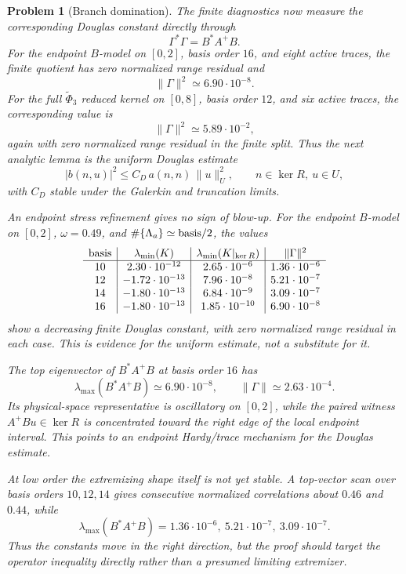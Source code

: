 \documentclass[11pt]{article}
\newtheorem{problem}[theorem]{Problem}
\begin{document}
\begin{problem}[Branch domination]
The finite diagnostics now measure the corresponding Douglas constant directly
through
\[
  \Gamma^*\Gamma=B^*A^+B.
\]
For the endpoint \(B\)-model on \([0,2]\), basis order \(16\), and eight
active traces, the finite quotient has zero normalized range residual and
\[
  \|\Gamma\|^2\simeq 6.90\cdot10^{-8}.
\]
For the full \(\widetilde\Phi_3\) reduced kernel on \([0,8]\), basis order
\(12\), and six active traces, the corresponding value is
\[
  \|\Gamma\|^2\simeq 5.89\cdot10^{-2},
\]
again with zero normalized range residual in the finite split.  Thus the next
analytic lemma is the uniform Douglas estimate
\[
  |b(n,u)|^2\le C_D\,a(n,n)\,\|u\|_U^2,
  \qquad n\in\ker R,\ u\in U,
\]
with \(C_D\) stable under the Galerkin and truncation limits.

An endpoint stress refinement gives no sign of blow-up.  For the endpoint
\(B\)-model on \([0,2]\), \(\omega=0.49\), and
\(\#\{\Lambda_a\}\simeq{\rm basis}/2\), the values
\[
\begin{array}{c|c|c|c}
{\rm basis} & \lambda_{\min}(K) & \lambda_{\min}(K|_{\ker R})
& \|\Gamma\|^2 \\
\hline
10 &  2.30\cdot10^{-12} & 2.65\cdot10^{-6}  & 1.36\cdot10^{-6}\\
12 & -1.72\cdot10^{-13} & 7.96\cdot10^{-8}  & 5.21\cdot10^{-7}\\
14 & -1.80\cdot10^{-13} & 6.84\cdot10^{-9}  & 3.09\cdot10^{-7}\\
16 & -1.80\cdot10^{-13} & 1.85\cdot10^{-10} & 6.90\cdot10^{-8}
\end{array}
\]
show a decreasing finite Douglas constant, with zero normalized range residual
in each case.  This is evidence for the uniform estimate, not a substitute for
it.

The top eigenvector of \(B^*A^+B\) at basis order \(16\) has
\[
  \lambda_{\max}(B^*A^+B)\simeq 6.90\cdot10^{-8},
  \qquad \|\Gamma\|\simeq 2.63\cdot10^{-4}.
\]
Its physical-space representative is oscillatory on \([0,2]\), while the
paired witness \(A^+Bu\in\ker R\) is concentrated toward the right edge of the
local endpoint interval.  This points to an endpoint Hardy/trace mechanism for
the Douglas estimate.

At low order the extremizing shape itself is not yet stable.  A top-vector scan
over basis orders \(10,12,14\) gives consecutive normalized correlations about
\(0.46\) and \(0.44\), while
\[
  \lambda_{\max}(B^*A^+B)
  =
  1.36\cdot10^{-6},\ 5.21\cdot10^{-7},\ 3.09\cdot10^{-7}.
\]
Thus the constants move in the right direction, but the proof should target
the operator inequality directly rather than a presumed limiting extremizer.


\end{problem}
\end{document}
